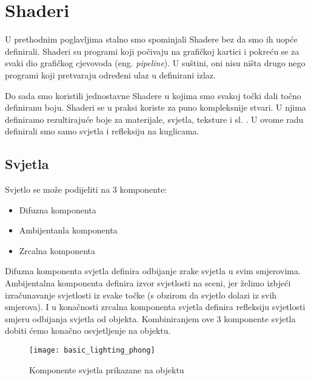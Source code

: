 \section{Shaderi}
U prethodnim poglavljima stalno smo spominjali Shadere bez da smo ih uopće definirali. Shaderi su programi koji počivaju na grafičkoj kartici i pokreću se za svaki dio grafičkog cjevovoda (eng. \emph{pipeline}). U suštini, oni nisu ništa drugo nego programi koji pretvaraju određeni ulaz u definirani izlaz\cite{16}. 

Do sada smo koristili jednostavne Shadere u kojima smo svakoj točki dali točno definiranu boju. Shaderi se u praksi koriste za puno kompleksnije stvari. U njima definiramo rezultirajuće boje za materijale, svjetla, teksture i sl. . U ovome radu definirali smo samo svjetla i refleksiju na kuglicama.

\subsection{Svjetla}
Svjetlo se može podijeliti na 3 komponente\cite{16}:
\begin{itemize}
	\item Difuzna komponenta
	\item Ambijentanla komponenta 
	\item Zrcalna komponenta  
\end{itemize}
Difuzna komponenta svjetla definira odbijanje zrake svjetla u svim smjerovima. Ambijentalna komponenta definira izvor svjetlosti na sceni, jer želimo izbjeći izračunavanje svjetlosti iz svake točke (s obzirom da svjetlo dolazi iz svih smjerova). I u konačnosti zrcalna komponenta svjetla definira refleksiju svjetlosti smjeru odbijanja svjetla od objekta\cite{15}. Kombiniranjem ove 3 komponente svjetla dobiti ćemo konačno osvjetljenje na objektu.
\begin{figure}[!http]
	\begin{center}
		\texttt{[image: basic\_lighting\_phong]}
		\caption{Komponente svjetla prikazane na objektu\cite{16}}
		\label{fig:33}
	\end{center}
\end{figure}

